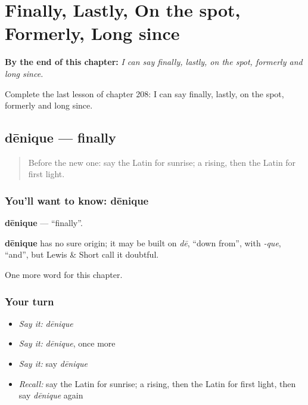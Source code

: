 
\chapter{Finally, Lastly, On the spot, Formerly, Long since}
\label{ch:la-finally-lastly-on-the-spot-formerly-long-since}

\begin{chapteropening}
\textbf{By the end of this chapter:} \emph{I can say finally, lastly, on the spot, formerly and long since.}

Complete the last lesson of chapter 208: I can say finally, lastly, on the spot, formerly and long since.
\end{chapteropening}

\section[dēnique]{dēnique — finally}

\label{lesson:LA-C208-denique}



\begin{quote}
Before the new one: say the Latin for sunrise; a rising, then the Latin for first light.
\end{quote}

\subsection*{You'll want to know: dēnique}
\textbf{dēnique} — \textquotedblleft{}finally\textquotedblright{}.

\begin{cousinweb}
\textbf{dēnique} has no sure origin; it may be built on \emph{dē}, \textquotedblleft{}down from\textquotedblright{}, with \emph{-que}, \textquotedblleft{}and\textquotedblright{}, but Lewis \& Short call it doubtful.
\end{cousinweb}

\begin{grammarlens}[title={What you've built}]
One more word for this chapter.
\end{grammarlens}

\subsection*{Your turn}
\begin{itemize}
\raggedright
  \item \emph{Say it:} \emph{dēnique}
  \item \emph{Say it:} \emph{dēnique}, once more
  \item \emph{Say it:} say \emph{dēnique}
  \item \emph{Recall:} say the Latin for sunrise; a rising, then the Latin for first light, then say \emph{dēnique} again
\end{itemize}

